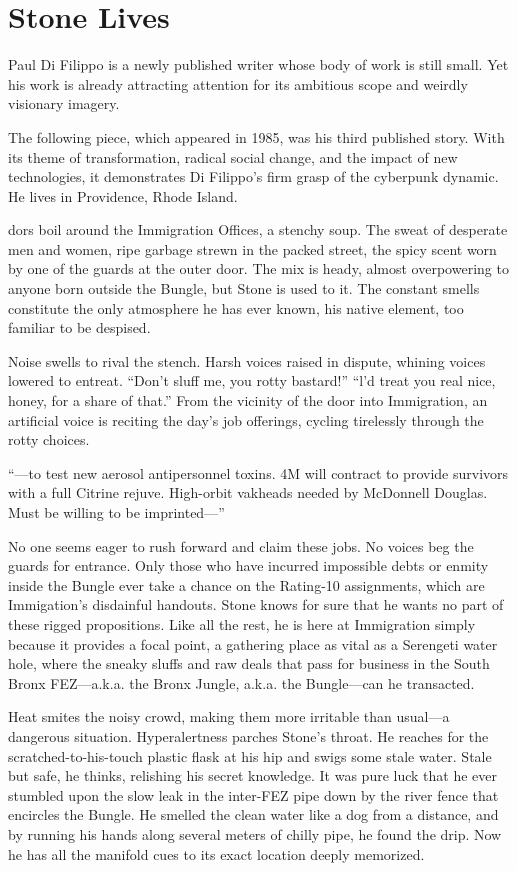 \chapter{Stone Lives}

Paul Di Filippo is a newly published writer whose body of work is still small. Yet his work is already attracting attention for its ambitious scope and weirdly visionary imagery.

The following piece, which appeared in 1985, was his third published story. With its theme of transformation, radical social change, and the impact of new technologies, it demonstrates Di Filippo's firm grasp of the cyberpunk dynamic. He lives in Providence, Rhode Island.

\hrulefill

dors boil around the Immigration Offices, a stenchy soup. The sweat of desperate men and women, ripe garbage strewn in the packed street, the spicy scent worn by one of the guards at the outer door. The mix is heady, almost overpowering to anyone born outside the Bungle, but Stone is used to it. The constant smells constitute the only atmosphere he has ever known, his native element, too familiar to be despised.

Noise swells to rival the stench. Harsh voices raised in dispute, whining voices lowered to entreat. “Don’t sluff me, you rotty bastard!” “l’d treat you real nice, honey, for a share of that.” From the vicinity of the door into Immigration, an artificial voice is reciting the day’s job offerings, cycling tirelessly through the rotty choices.

“—to test new aerosol antipersonnel toxins. 4M will contract to provide survivors with a full Citrine rejuve. High-orbit vakheads needed by McDonnell Douglas. Must be willing to be imprinted—”

No one seems eager to rush forward and claim these jobs. No voices beg the guards for entrance. Only those who have incurred impossible debts or enmity inside the Bungle ever take a chance on the Rating-10 assignments, which are Immigation’s disdainful handouts. Stone knows for sure that he wants no part of these rigged propositions. Like all the rest, he is here at Immigration simply because it provides a focal point, a gathering place as vital as a Serengeti water hole, where the sneaky sluffs and raw deals that pass for business in the South Bronx FEZ—a.k.a. the Bronx Jungle, a.k.a. the Bungle—can he transacted.

Heat smites the noisy crowd, making them more irritable than usual—a dangerous situation. Hyperalertness parches Stone’s throat. He reaches for the scratched-to-his-touch plastic flask at his hip and swigs some stale water. Stale but safe, he thinks, relishing his secret knowledge. It was pure luck that he ever stumbled upon the slow leak in the inter-FEZ pipe down by the river fence that encircles the Bungle. He smelled the clean water like a dog from a distance, and by running his hands along several meters of chilly pipe, he found the drip. Now he has all the manifold cues to its exact location deeply memorized.

